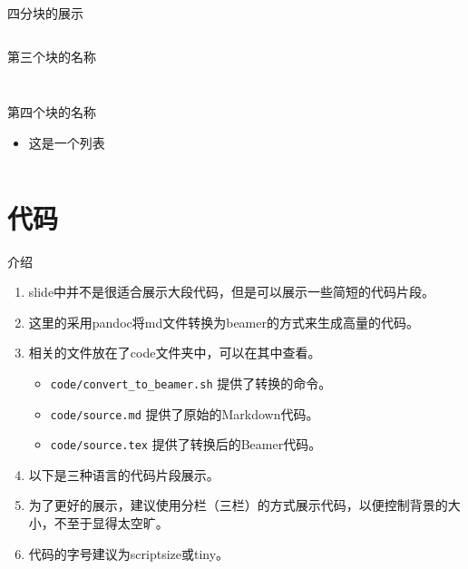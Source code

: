\documentclass[aspectratio=169]{beamer}
\begin{document}
\begin{frame}{四分块的展示}
\begin{columns}[t]
\begin{column}{0.5\textwidth}
\begin{block}{\scriptsize 第三个块的名称}
\begin{columns}
\begin{column}{0.5\textwidth}
\begin{figure}
                            \label{fig:figinblock}
                        \end{figure}
                    \end{column}
                \end{columns}
            \end{block}	
            \begin{block}{\scriptsize 第四个块的名称}
                \begin{itemize}
                    \item 这是一个列表
                \end{itemize}
                \raggedright 
            \end{block}	
        \end{column}
    \end{columns}
\end{frame}

\section{代码}

\begin{frame}{介绍}
    \begin{enumerate}
        \item slide中并不是很适合展示大段代码，但是可以展示一些简短的代码片段。
        \item 这里的采用pandoc将md文件转换为beamer的方式来生成高量的代码。
        \item 相关的文件放在了code文件夹中，可以在其中查看。
        \begin{itemize}
            \item \texttt{code/convert\_to\_beamer.sh} 提供了转换的命令。
            \item \texttt{code/source.md} 提供了原始的Markdown代码。
            \item \texttt{code/source.tex} 提供了转换后的Beamer代码。
        \end{itemize}
        \item 以下是三种语言的代码片段展示。
        \item 为了更好的展示，建议使用分栏（三栏）的方式展示代码，以便控制背景的大小，不至于显得太空旷。
        \item 代码的字号建议为scriptsize或tiny。
    \end{enumerate}
\end{frame}
\end{document}
